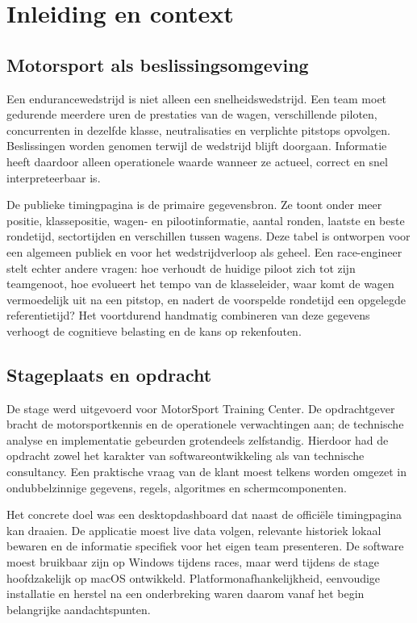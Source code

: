 \chapter{Inleiding en context}
\label{chap:context}

\section{Motorsport als beslissingsomgeving}
Een endurancewedstrijd is niet alleen een snelheidswedstrijd. Een team moet gedurende meerdere uren de prestaties van de wagen, verschillende piloten, concurrenten in dezelfde klasse, neutralisaties en verplichte pitstops opvolgen. Beslissingen worden genomen terwijl de wedstrijd blijft doorgaan. Informatie heeft daardoor alleen operationele waarde wanneer ze actueel, correct en snel interpreteerbaar is.

De publieke timingpagina is de primaire gegevensbron. Ze toont onder meer positie, klassepositie, wagen- en pilootinformatie, aantal ronden, laatste en beste rondetijd, sectortijden en verschillen tussen wagens. Deze tabel is ontworpen voor een algemeen publiek en voor het wedstrijdverloop als geheel. Een race-engineer stelt echter andere vragen: hoe verhoudt de huidige piloot zich tot zijn teamgenoot, hoe evolueert het tempo van de klasseleider, waar komt de wagen vermoedelijk uit na een pitstop, en nadert de voorspelde rondetijd een opgelegde referentietijd? Het voortdurend handmatig combineren van deze gegevens verhoogt de cognitieve belasting en de kans op rekenfouten.

\section{Stageplaats en opdracht}
De stage werd uitgevoerd voor MotorSport Training Center. De opdrachtgever bracht de motorsportkennis en de operationele verwachtingen aan; de technische analyse en implementatie gebeurden grotendeels zelfstandig. Hierdoor had de opdracht zowel het karakter van softwareontwikkeling als van technische consultancy. Een praktische vraag van de klant moest telkens worden omgezet in ondubbelzinnige gegevens, regels, algoritmes en schermcomponenten.

Het concrete doel was een desktopdashboard dat naast de officiële timingpagina kan draaien. De applicatie moest live data volgen, relevante historiek lokaal bewaren en de informatie specifiek voor het eigen team presenteren. De software moest bruikbaar zijn op Windows tijdens races, maar werd tijdens de stage hoofdzakelijk op macOS ontwikkeld. Platformonafhankelijkheid, eenvoudige installatie en herstel na een onderbreking waren daarom vanaf het begin belangrijke aandachtspunten.

